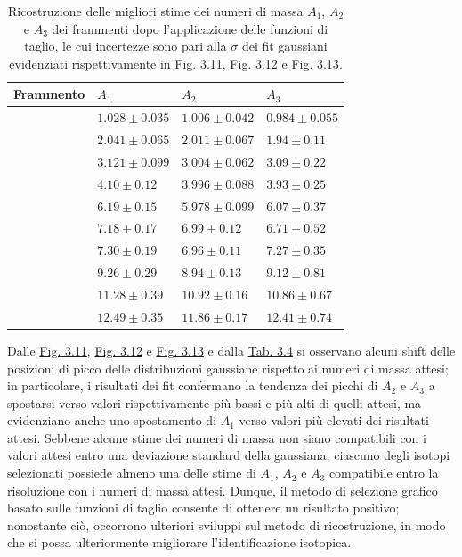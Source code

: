 \documentclass[12pt,a4paper,twoside]{report}
\begin{document}
	\begin{table}[H]
		\begin{minipage}{\textwidth}
			\centering
			\begin{tabular}{ |M{2.2cm}|M{3.0cm}|M{3.0cm}|M{3.0cm}| }
				\hline
				Frammento &$A_1$&$A_2$&$A_3$\\
				\hline\hline
				& $1.028\pm0.035$& $1.006\pm0.042$ &$0.984\pm0.055$\\
				\hline
				& $2.041\pm0.065$& $2.011\pm0.067$ &$1.94\pm0.11$\\
				\hline
				& $3.121\pm0.099$& $3.004\pm0.062$ &$3.09\pm0.22$\\
				\hline
				& $4.10\pm0.12$& $3.996\pm0.088$ &$3.93\pm0.25$\\
				\hline
				& $6.19\pm0.15$& $5.978 \pm0.099 $ &$6.07 \pm0.37 $\\
				\hline
				& $7.18 \pm0.17 $& $6.99 \pm0.12 $ &$6.71 \pm0.52 $\\
				\hline
				& $7.30 \pm0.19 $& $6.96 \pm0.11 $ &$7.27 \pm0.35 $\\
				\hline
				& $9.26 \pm0.29 $& $8.94 \pm0.13 $ &$9.12 \pm0.81 $\\
				\hline
				& $11.28\pm0.39 $& $10.92\pm0.16 $ &$10.86 \pm0.67 $\\
				\hline
				& $12.49 \pm0.35 $& $11.86 \pm0.17 $ &$12.41 \pm0.74 $\\
				\hline
			\end{tabular}
		\end{minipage}
		\caption{Ricostruzione delle migliori stime dei numeri di massa $A_1$, $A_2$ e $A_3$ dei frammenti dopo l'applicazione delle funzioni di taglio, le cui incertezze sono pari alla $\sigma$ dei fit gaussiani evidenziati rispettivamente in \hyperref[fig:a1_fragments_final]{Fig. 3.11}, \hyperref[fig:a2_fragments_final]{Fig. 3.12} e \hyperref[fig:a3_fragments_final]{Fig. 3.13}.}
		\label{tab:mass_numbers}
	\end{table}
	Dalle \hyperref[fig:a1_fragments_final]{Fig. 3.11}, \hyperref[fig:a2_fragments_final]{Fig. 3.12} e \hyperref[fig:a3_fragments_final]{Fig. 3.13} e dalla \hyperref[tab:mass_numbers]{Tab. 3.4} si osservano alcuni shift delle posizioni di picco delle distribuzioni gaussiane rispetto ai numeri di massa attesi; in particolare, i risultati dei fit confermano la tendenza dei picchi di $A_2$ e $A_3$ a spostarsi verso valori rispettivamente più bassi e più alti di quelli attesi, ma evidenziano anche uno spostamento di $A_1$ verso valori più elevati dei risultati attesi. Sebbene alcune stime dei numeri di massa non siano compatibili con i valori attesi entro una deviazione standard della gaussiana, ciascuno degli isotopi selezionati possiede almeno una delle stime di $A_1$, $A_2$ e $A_3$ compatibile entro la risoluzione con i numeri di massa attesi. Dunque, il metodo di selezione grafico basato sulle funzioni di taglio consente di ottenere un risultato positivo; nonostante ciò, occorrono ulteriori sviluppi sul metodo di ricostruzione, in modo che si possa ulteriormente migliorare l'identificazione isotopica.
\end{document}
